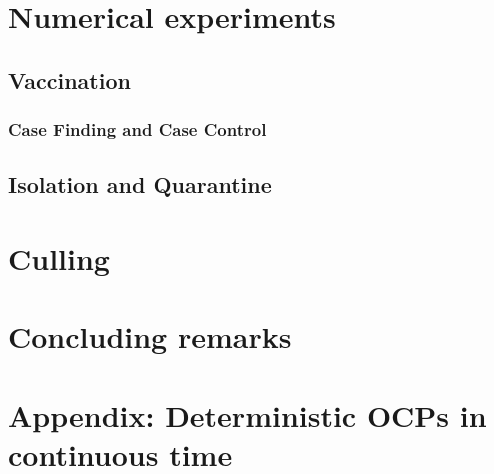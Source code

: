 \documentclass[a4paper]{amsart}
\begin{document}
  \section{Numerical experiments}
    \subsection*{Vaccination}
      
    \subsubsection*{Case Finding and Case Control}
      
    \subsection*{Isolation and Quarantine}
      
    \section{Culling}
      
%
%
  \section{Concluding remarks}
%
\section{Appendix: Deterministic OCPs in continuous time}
    
%
%
  
  
\end{document}
